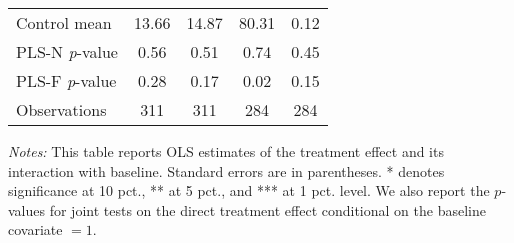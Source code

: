 \begin{table}[ht]
{\begin{threeparttable}
\begin{tabular}{l*{4}{c}}
Control mean    &    13.66         &    14.87         &    80.31         &     0.12         \\
PLS-N \emph{p}-value&     0.56         &     0.51         &     0.74         &     0.45         \\
PLS-F \emph{p}-value&     0.28         &     0.17         &     0.02         &     0.15         \\
Observations    &      311         &      311         &      284         &      284         \\
\bottomrule \end{tabular} \begin{tablenotes}[flushleft] \footnotesize \item \emph{Notes:} This table reports OLS estimates of the treatment effect and its interaction with baseline. Standard errors are in parentheses. * denotes significance at 10 pct., ** at 5 pct., and *** at 1 pct. level. We also report the \(p\)-values for joint tests on the direct treatment effect conditional on the baseline covariate $= 1$. \end{tablenotes} \end{threeparttable} } \end{table}


